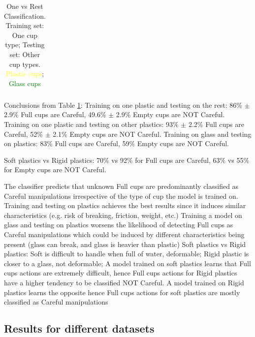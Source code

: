 \begin{table}
{\begin{tabular}{l l c c c c c c}
\midrule %
\midrule %
\end{tabular}
}
\caption{One vs Rest Classification. Training set: One cup type; Testing set: Other cup types. \textcolor{Yellow}{Plastic cups}; \textcolor{Green}{Glass cups}}
\label{tab:one_vs_all} 
\end{table}

Conclusions from Table \ref{tab:one_vs_all}:
Training on one plastic and testing on the rest: 86\% $\pm$ 2.9\% Full cups are Careful, 49.6\% $\pm$ 2.9\% Empty cups are NOT Careful. Training on one plastic and testing on other plastics: 93\% $\pm$ 2.2\% Full cups are Careful, 52\% $\pm$ 2.1\% Empty cups are NOT Careful. Training on glass and testing on plastics: 83\% Full cups are Careful,	59\% Empty cups are NOT Careful.

Soft plastics vs Rigid plastics: 70\% vs 92\% for Full cups are Careful, 63\% vs 55\% for Empty cups are NOT Careful. 

The classifier predicts that unknown Full cups are predominantly classified as Careful manipulations irrespective of the type of cup the model is trained on.
Training and testing on plastics achieves the best results since it induces similar characteristics (e.g. risk of breaking, friction, weight, etc.) 
Training a model on glass and testing on plastics worsens the likelihood of detecting Full cups as Careful manipulations which could be induced by different characteristics being present (glass can break, and glass is heavier than plastic)
Soft plastics vs Rigid plastics: 		
Soft is difficult to handle when full of water, deformable;
Rigid plastic is closer to a glass, not deformable; 
A model trained on soft plastics learns that Full cups actions are extremely difficult, hence Full cups actions for Rigid plastics have a higher tendency to be classified NOT Careful.
A model trained on Rigid plastics learns the opposite hence Full cups actions for soft plastics are mostly classified as Careful manipulations

\subsection{Results for different datasets}


